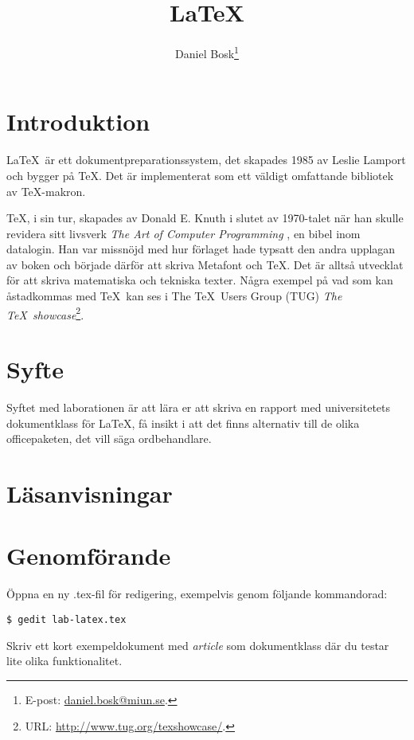 \documentclass[11pt,a4paper]{miunasgn}
\title{\LaTeX}
\author{Daniel Bosk\footnote{%
	E-post: \href{mailto:daniel.bosk@miun.se}{daniel.bosk@miun.se}.
}}
\date{\svnId}
\begin{document}
\maketitle
\thispagestyle{foot}
\tableofcontents


\section{Introduktion}
\label{sec:Introduktion}
\noindent
\LaTeX\ är ett dokumentpreparationssystem, det skapades 1985 av Leslie Lamport 
och bygger på \TeX.
Det är implementerat som ett väldigt omfattande bibliotek av \TeX-makron.

\TeX, i sin tur, skapades av Donald E. Knuth i slutet av 1970-talet när han 
skulle revidera sitt livsverk \emph{The Art of Computer Programming} 
\citep{TUG2011jwi}, en bibel inom datalogin.
Han var missnöjd med hur förlaget hade typsatt den andra upplagan av boken och 
började därför att skriva Metafont och \TeX.
Det är alltså utvecklat för att skriva matematiska och tekniska texter.
Några exempel på vad som kan åstadkommas med \TeX\ kan ses i The \TeX\ Users 
Group (TUG) \emph{The \TeX\ showcase}\footnote{%
	URL: \url{http://www.tug.org/texshowcase/}.
}.


\section{Syfte}
\label{sec:Syfte}
\noindent
Syftet med laborationen är att lära er att skriva en rapport med universitetets 
dokumentklass för \LaTeX, få insikt i att det finns alternativ till de olika 
officepaketen, det vill säga ordbehandlare.


\section{Läsanvisningar}
\label{sec:Lasanvisningar}
\noindent



\section{Genomförande}
\label{sec:Genomforande}
\noindent
Öppna en ny .tex-fil för redigering, exempelvis genom följande kommandorad:
\begin{lstlisting}
$ gedit lab-latex.tex
\end{lstlisting}
Skriv ett kort exempeldokument med \emph{article} som dokumentklass där du 
testar lite olika funktionalitet.
\end{document}
